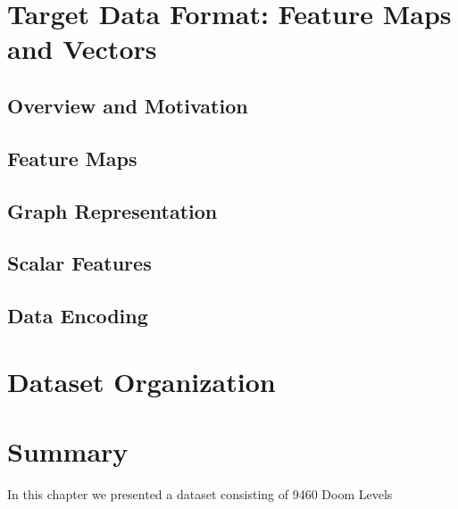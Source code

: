 \paragraph{}
\paragraph{}

\section{Target Data Format: Feature Maps and Vectors}
\label{sec:TargetFormat}
\subsection{Overview and Motivation}
\subsection{Feature Maps}
\subsection{Graph Representation}
\subsection{Scalar Features}
\subsection{Data Encoding}

\section{Dataset Organization}
\label{sec:DatasetOrganization}

\section{Summary}
In this chapter we presented a dataset consisting of 9460 Doom Levels %